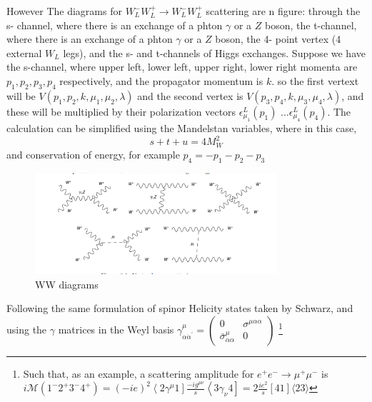 \documentclass[11pt]{article}
\begin{document}
{%
However
The diagrams for $W_{L}^{-} W_{L}^{+} \rightarrow W_{L}^{-} W_{L}^{+}$ scattering are n figure: through the s- channel, where there is an exchange of a phton $\gamma$ or a $Z$ boson, the t-channel, where there is an exchange of a phton $\gamma$ or a $Z$ boson, the 4- point vertex (4 external $W_L$ legs), and the s- and t-channels of Higgs exchanges.
Suppose we have the s-channel, where upper left, lower left, upper right, lower right momenta are $p_1, p_2, p_3, p_4$ respectively, and the propagator momentum is $k$. so the first vertext will be $V(p_1, p_2, k, \mu_1, \mu_2, \lambda)$ and the second vertex is $V(p_3, p_4, k, \mu_3, \mu_4, \lambda)$, and these will be multiplied by their polarization vectors $\epsilon_{\mu_1}^L(p_1)$ ...$\epsilon_{\mu_4}^L(p_4)$. The calculation can be simplified using the Mandelstan variables, where in this case,
\begin{equation}
    s+t+u=4 M_W^2
\end{equation}
and conservation of energy, for example $p_4=-p_1-p_2-p_3$
\begin{figure}[h]
\caption{WW diagrams}
\centering
\includegraphics[width=0.8\textwidth]{WW_diagrams_nohiggs.png}
\end{figure}

Following the same formulation of spinor Helicity states taken by Schwarz, and using the $\gamma$ matrices in the Weyl basis $\gamma_{\alpha \dot{\alpha}^{\prime}}^{\mu}=\left(\begin{array}{cc}
0 & \sigma^{\mu \alpha \alpha} \\
\bar{\sigma}_{\alpha \alpha}^{\mu} & 0
\end{array}\right)$
\footnote{Such that, as an example, a scattering amplitude for $e^{+} e^{-} \rightarrow \mu^{+} \mu^{-}$ is $i \mathcal{M}\left(1^{-} 2^{+} 3^{-} 4^{+}\right)=(-i e)^{2}\left\langle 2 \gamma^{\mu} 1\right] \frac{-i g^{\mu \nu}}{s}\left\langle 3 \gamma_{\nu} 4\right]=2 \frac{i e^{2}}{s}[41]\langle 23\rangle$ }

}
\end{document}
